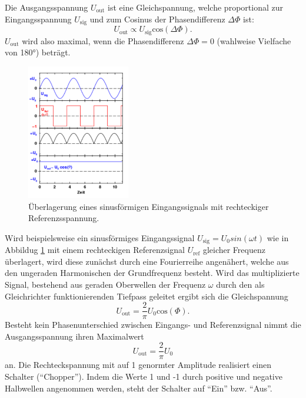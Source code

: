 Die Ausgangsspannung $U_\mathup{out}$ ist eine Gleichspannung, welche proportional zur Eingangsspannung $U_\mathup{sig}$ und zum Cosinus der Phasendifferenz $\Delta\Phi$ ist:
\begin{equation}
 	U_\mathup{out}\propto{U_\text{sig}}\text{cos}(\Delta\Phi). 
 	\label{cosinus_ausgangsspannung}
 \end{equation} 
$U_\mathup{out}$ wird also maximal, wenn die Phasendifferenz $\Delta\Phi=0$ (wahlweise Vielfache von 180°) beträgt. \cite{regensburg}

\begin{figure}
	\centering
		\includegraphics[width=0.4\textwidth]{Bilder/Beispiel.pdf}
		\caption{Überlagerung eines sinusförmigen Eingangssignals mit rechteckiger Referenzsspannung. \cite{V303}}
		\label{fig:bsp}
	\end{figure}
Wird beispielsweise ein sinusförmiges Eingangssignal $U_\mathup{sig}=U_0sin(\omega t)$ wie in Abbildug \ref{fig:bsp} mit einem rechteckigen Referenzsignal $U_\mathup{ref}$ gleicher Frequenz überlagert, wird diese zunächst durch eine Fourierreihe angenähert, welche aus den ungeraden Harmonischen der Grundfrequenz besteht. 
Wird das multiplizierte Signal,  bestehend aus geraden Oberwellen der Frequenz $\omega$ durch den als Gleichrichter funktionierenden Tiefpass geleitet ergibt sich die Gleichspannung
\begin{equation}
	U_\mathup{out}=\frac{2}{\pi}U_0\text{cos}(\Phi).
\end{equation}
Besteht kein Phasenunterschied zwischen Eingangs- und Referenzsignal nimmt die Ausgangsspannung ihren Maximalwert 
\begin{equation}
	U_\mathup{out}=\frac{2}{\pi}U_0
\end{equation}
an.
Die Rechteckspannung mit auf 1 genormter Amplitude realisiert einen Schalter (\enquote{Chopper}). 
Indem die Werte 1 und -1 durch positive und negative Halbwellen angenommen werden, steht der Schalter auf \enquote{Ein} bzw. \enquote{Aus}.



